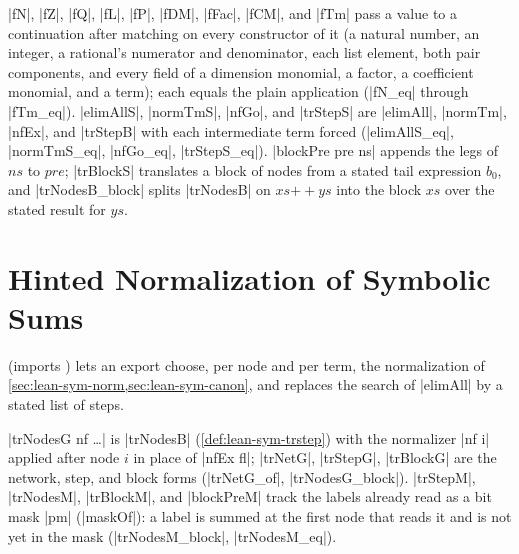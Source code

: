 \begin{definition}\label{def:lean-sym-forced}
\lean|fN|, \lean|fZ|, \lean|fQ|, \lean|fL|, \lean|fP|, \lean|fDM|, \lean|fFac|, \lean|fCM|, and \lean|fTm| pass a value to a continuation after matching on every constructor of it (a natural number, an integer, a rational's numerator and denominator, each list element, both pair components, and every field of a dimension monomial, a factor, a coefficient monomial, and a term); each equals the plain application (\lean|fN_eq| through \lean|fTm_eq|). \lean|elimAllS|, \lean|normTmS|, \lean|nfGo|, and \lean|trStepS| are \lean|elimAll|, \lean|normTm|, \lean|nfEx|, and \lean|trStepB| with each intermediate term forced (\lean|elimAllS_eq|, \lean|normTmS_eq|, \lean|nfGo_eq|, \lean|trStepS_eq|). \lean|blockPre pre ns| appends the legs of $ns$ to $pre$; \lean|trBlockS| translates a block of nodes from a stated tail expression $b_0$, and \lean|trNodesB_block| splits \lean|trNodesB| on $xs\mathbin{+\!\!+}ys$ into the block $xs$ over the stated result for $ys$.
\end{definition}

\section{Hinted Normalization of Symbolic Sums}\label{sec:lean-sym-hint}

 (imports ) lets an export choose, per node and per term, the normalization of \cref{sec:lean-sym-norm,sec:lean-sym-canon}, and replaces the search of \lean|elimAll| by a stated list of steps.

\begin{definition}\label{def:lean-sym-trG}
\lean|trNodesG nf …| is \lean|trNodesB| (\cref{def:lean-sym-trstep}) with the normalizer \lean|nf i| applied after node $i$ in place of \lean|nfEx fl|; \lean|trNetG|, \lean|trStepG|, \lean|trBlockG| are the network, step, and block forms (\lean|trNetG_of|, \lean|trNodesG_block|). \lean|trStepM|, \lean|trNodesM|, \lean|trBlockM|, and \lean|blockPreM| track the labels already read as a bit mask \lean|pm| (\lean|maskOf|): a label is summed at the first node that reads it and is not yet in the mask (\lean|trNodesM_block|, \lean|trNodesM_eq|).
\end{definition}

